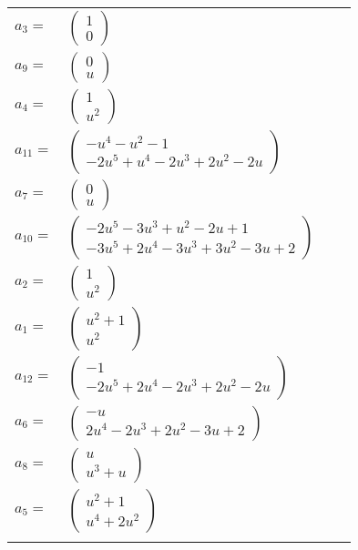 \documentclass[1p]{elsarticle_modified}
\theoremstyle{definition}
\begin{document}
\begin{tabular}{m{7pt} m{180pt} m{7pt} m{180pt} }
\flushright $a_{3}=$&$\begin{pmatrix}1\\0\end{pmatrix}$ \\
\flushright $a_{9}=$&$\begin{pmatrix}0\\u\end{pmatrix}$ \\
\flushright $a_{4}=$&$\begin{pmatrix}1\\u^2\end{pmatrix}$ \\
\flushright $a_{11}=$&$\begin{pmatrix}- u^4- u^2-1\\-2 u^5+u^4-2 u^3+2 u^2-2 u\end{pmatrix}$ \\
\flushright $a_{7}=$&$\begin{pmatrix}0\\u\end{pmatrix}$ \\
\flushright $a_{10}=$&$\begin{pmatrix}-2 u^5-3 u^3+u^2-2 u+1\\-3 u^5+2 u^4-3 u^3+3 u^2-3 u+2\end{pmatrix}$ \\
\flushright $a_{2}=$&$\begin{pmatrix}1\\u^2\end{pmatrix}$ \\
\flushright $a_{1}=$&$\begin{pmatrix}u^2+1\\u^2\end{pmatrix}$ \\
\flushright $a_{12}=$&$\begin{pmatrix}-1\\-2 u^5+2 u^4-2 u^3+2 u^2-2 u\end{pmatrix}$ \\
\flushright $a_{6}=$&$\begin{pmatrix}- u\\2 u^4-2 u^3+2 u^2-3 u+2\end{pmatrix}$ \\
\flushright $a_{8}=$&$\begin{pmatrix}u\\u^3+u\end{pmatrix}$ \\
\flushright $a_{5}=$&$\begin{pmatrix}u^2+1\\u^4+2 u^2\end{pmatrix}$\\&\end{tabular}
\end{document}
